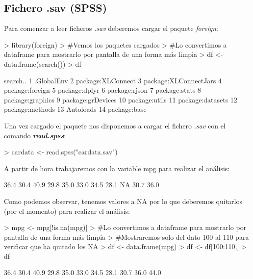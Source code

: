 \documentclass [a4paper] {article}
\begin{document}
\subsection{Fichero .sav (SPSS)}
Para comenzar a leer ficheros \textit{.sav} deberemos cargar el paquete \textit{foreign}:
\begin{Schunk}
\begin{Sinput}
> library(foreign)
> #Vemos los paquetes cargados
> #Lo convertimos a dataframe para mostrarlo por pantalla de una forma más limpia
> df <- data.frame(search())
> df
\end{Sinput}
\begin{Soutput}
                search..
1             .GlobalEnv
2      package:XLConnect
3  package:XLConnectJars
4        package:foreign
5          package:dplyr
6          package:rjson
7          package:stats
8       package:graphics
9      package:grDevices
10         package:utils
11      package:datasets
12       package:methods
13             Autoloads
14          package:base
\end{Soutput}
\end{Schunk}

Una vez cargado el paquete nos disponemos a cargar el fichero \textit{.sav} con el comando \textbf{\textit{read.spss}}:
\begin{Schunk}
\begin{Sinput}
> cardata <- read.spss("cardata.sav")
\end{Sinput}
\end{Schunk}

A partir de hora trabajaremos con la variable mpg para realizar el análisis:
\begin{Schunk}
\begin{Soutput}
 [1] 36.4 30.4 40.9 29.8 35.0 33.0 34.5 28.1   NA 30.7 36.0
\end{Soutput}
\end{Schunk}
\newpage
Como podemos observar, tenemos valores a NA por lo que deberemos quitarlos (por el momento) para realizar el análisis:
\begin{Schunk}
\begin{Sinput}
> mpg <- mpg[!is.na(mpg)]
> #Lo convertimos a dataframe para mostrarlo por pantalla de una forma más limpia
> #Mostraremos solo del dato 100 al 110 para verificar que ha quitado los NA
> df <- data.frame(mpg)
> df <- df[100:110,]
> df
\end{Sinput}
\begin{Soutput}
 [1] 36.4 30.4 40.9 29.8 35.0 33.0 34.5 28.1 30.7 36.0 44.0
\end{Soutput}
\end{Schunk}
\end{document}
